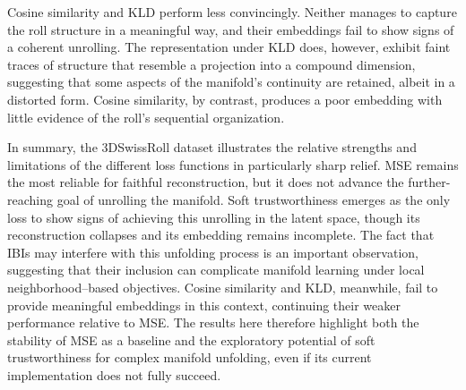 Cosine similarity and KLD perform less convincingly. Neither manages to capture the roll structure in a meaningful way, and their embeddings fail to show signs of a coherent unrolling. The representation under KLD does, however, exhibit faint traces of structure that resemble a projection into a compound dimension, suggesting that some aspects of the manifold’s continuity are retained, albeit in a distorted form. Cosine similarity, by contrast, produces a poor embedding with little evidence of the roll’s sequential organization.

In summary, the 3DSwissRoll dataset illustrates the relative strengths and limitations of the different loss functions in particularly sharp relief. MSE remains the most reliable for faithful reconstruction, but it does not advance the further-reaching goal of unrolling the manifold. Soft trustworthiness emerges as the only loss to show signs of achieving this unrolling in the latent space, though its reconstruction collapses and its embedding remains incomplete. The fact that IBIs may interfere with this unfolding process is an important observation, suggesting that their inclusion can complicate manifold learning under local neighborhood–based objectives. Cosine similarity and KLD, meanwhile, fail to provide meaningful embeddings in this context, continuing their weaker performance relative to MSE. The results here therefore highlight both the stability of MSE as a baseline and the exploratory potential of soft trustworthiness for complex manifold unfolding, even if its current implementation does not fully succeed.


